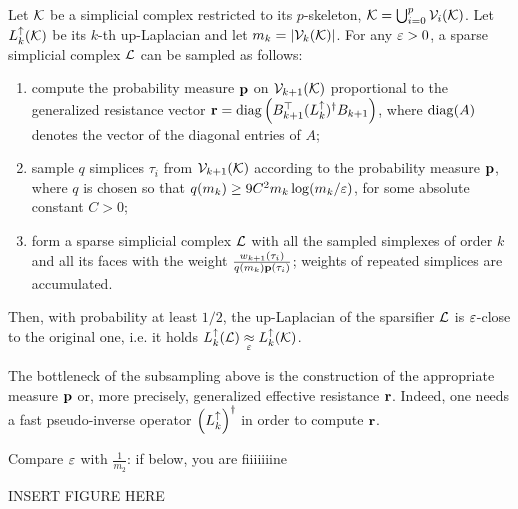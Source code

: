 \documentclass{mynotes}
\begin{document}
\begin{thm} \label{thm:sparsify}
      Let \( \mathcal{K} \) be a simplicial complex restricted to its \(p\)-skeleton, \( \mathcal{K} = \bigcup_{i=0}^p \mathcal{V}_{i}(\mathcal{K}) \).  Let   \( L_{k}^{\uparrow} (\mathcal{K} ) \) be its  \(k\)-th up-Laplacian and let \( m_k = | \mathcal{V}_{k}(\mathcal{K}) | \). For any \( \varepsilon > 0 \), a sparse simplicial complex \( \mathcal{L} \) can be sampled as follows:
      \begin{enumerate}[leftmargin=*, label=(\arabic*)]
            \item compute the probability measure \( \mathbf{p}  \) on \( \mathcal{V}_{k+1}(\mathcal{K}) \) proportional to the generalized resistance vector \( \mathbf{r} = \operatorname{diag} \left( B_{k+1}^\top ( L_{k}^{\uparrow} )^\dagger B_{k+1} \right) \), where  $\operatorname{diag}(A)$ denotes the vector of the diagonal entries of $A$;
            \item sample \(q\) simplices \( \tau_i \) from \( \mathcal{V}_{k+1}(\mathcal{K})\) according to the probability measure \( \mathbf{p}  \),  where $q$ is chosen so that  \( q ( m_k ) \ge 9 C^2 m_{k} \log ( m_{k} / \varepsilon  )\), for some absolute constant  \( C>0 \);
            \item form a sparse simplicial complex \( \mathcal{L} \) with all the sampled simplexes of order \( k \) and all its faces with the weight \( \frac{ w_{k+1} (\tau_i) }{ q(m_k) \mathbf{p}(\tau_i)  } \); weights of repeated simplices are accumulated.
      \end{enumerate}
      Then, with probability at least \(1/2\), the up-Laplacian of the sparsifier \( \mathcal{L} \) is \(\varepsilon\)-close to the original one, i.e. it holds \( L_{k}^{\uparrow} (\mathcal{L} ) \underset{\varepsilon}{\approx} L_{k}^{\uparrow} (\mathcal{K}) \).
\end{thm}

The bottleneck of the subsampling above is the construction of the appropriate measure \( \mathbf{p} \) or, more precisely, generalized effective resistance \( \mathbf{r} \). Indeed, one needs a fast pseudo-inverse operator \( \left(  L_{k}^{\uparrow} \right)^\dagger \) in order to compute \( \mathbf{r} \).

\begin{remark}
      Compare \( \varepsilon \) with \( \frac{1}{m_2}\): if below, you are fiiiiiiine

      INSERT FIGURE HERE
\end{remark}

\end{document}
